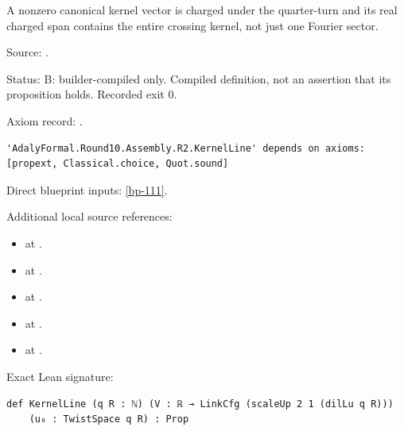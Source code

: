 \begin{definition}[bp-152]
\label{bp-152}
\leanok
A nonzero canonical kernel vector is charged under the quarter-turn and its real charged span contains the entire crossing kernel, not just one Fourier sector.

\par Source: \texttt{}.
\par Status: B: builder-compiled only. Compiled definition, not an assertion that its proposition holds. Recorded exit 0.
\par Axiom record: \texttt{}.
\begin{verbatim}
'AdalyFormal.Round10.Assembly.R2.KernelLine' depends on axioms: [propext, Classical.choice, Quot.sound]
\end{verbatim}
\par Direct blueprint inputs: \ref{bp-111}.
\par Additional local source references:
\begin{itemize}
\item \texttt{} at \texttt{}.
\item \texttt{} at \texttt{}.
\item \texttt{} at \texttt{}.
\item \texttt{} at \texttt{}.
\item \texttt{} at \texttt{}.
\end{itemize}
\par Exact Lean signature:
\begin{verbatim}
def KernelLine (q R : ℕ) (V : ℝ → LinkCfg (scaleUp 2 1 (dilLu q R)))
    (u₀ : TwistSpace q R) : Prop
\end{verbatim}
\end{definition}

